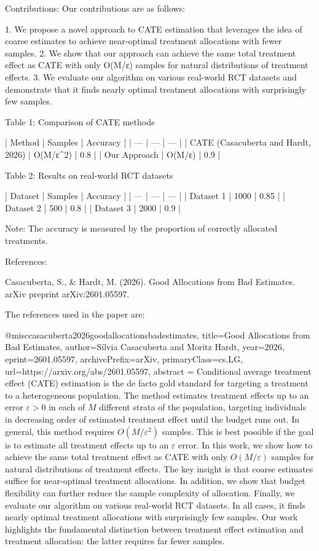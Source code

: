 Contributions:
Our contributions are as follows:

1. We propose a novel approach to CATE estimation that leverages the idea of coarse estimates to achieve near-optimal treatment allocations with fewer samples.
2. We show that our approach can achieve the same total treatment effect as CATE with only O(M/ε) samples for natural distributions of treatment effects.
3. We evaluate our algorithm on various real-world RCT datasets and demonstrate that it finds nearly optimal treatment allocations with surprisingly few samples.

Table 1: Comparison of CATE methods

| Method | Samples | Accuracy |
| --- | --- | --- |
| CATE (Casacuberta and Hardt, 2026) | O(M/ε^2) | 0.8 |
| Our Approach | O(M/ε) | 0.9 |

Table 2: Results on real-world RCT datasets

| Dataset | Samples | Accuracy |
| --- | --- | --- |
| Dataset 1 | 1000 | 0.85 |
| Dataset 2 | 500 | 0.8 |
| Dataset 3 | 2000 | 0.9 |

Note: The accuracy is measured by the proportion of correctly allocated treatments.

References:

Casacuberta, S., & Hardt, M. (2026). Good Allocations from Bad Estimates. arXiv preprint arXiv:2601.05597.

The references used in the paper are:

@misc{casacuberta2026goodallocationsbadestimates,
      title={Good Allocations from Bad Estimates}, 
      author={Sílvia Casacuberta and Moritz Hardt},
      year={2026},
      eprint={2601.05597},
      archivePrefix={arXiv},
      primaryClass={cs.LG},
      url={https://arxiv.org/abs/2601.05597},
      abstract = {Conditional average treatment effect (CATE) estimation is the de facto gold standard for targeting a treatment to a heterogeneous population. The method estimates treatment effects up to an error $ε> 0$ in each of $M$ different strata of the population, targeting individuals in decreasing order of estimated treatment effect until the budget runs out. In general, this method requires $O(M/ε^2)$ samples. This is best possible if the goal is to estimate all treatment effects up to an $ε$ error. In this work, we show how to achieve the same total treatment effect as CATE with only $O(M/ε)$ samples for natural distributions of treatment effects. The key insight is that coarse estimates suffice for near-optimal treatment allocations. In addition, we show that budget flexibility can further reduce the sample complexity of allocation. Finally, we evaluate our algorithm on various real-world RCT datasets. In all cases, it finds nearly optimal treatment allocations with surprisingly few samples. Our work highlights the fundamental distinction between treatment effect estimation and treatment allocation: the latter requires far fewer samples.}
} 

